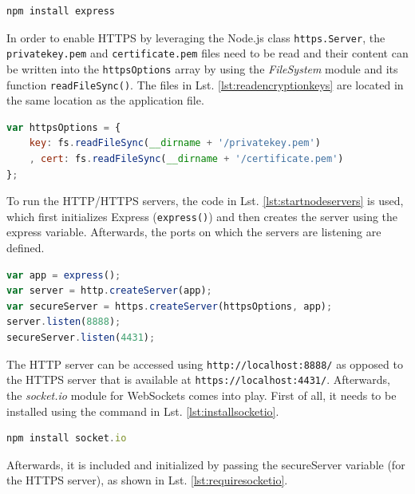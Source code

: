\begin{lstlisting}[language=javascript,caption={Installing Express via command-line},label=lst:expressinstallation]
npm install express 
\end{lstlisting}

In order to enable HTTPS by leveraging the Node.js class \texttt{https.Server}, the \texttt{privatekey.pem} and \texttt{certificate.pem} files need to be read and their content can be written into the \texttt{httpsOptions} array by using the \textit{FileSystem} module and its function \texttt{readFileSync()}. The files in Lst. \ref{lst:readencryptionkeys} are located in the same location as the application file.

\begin{lstlisting}[language=javascript,caption={Reading encryption keys},label=lst:readencryptionkeys]
var httpsOptions = {
    key: fs.readFileSync(__dirname + '/privatekey.pem')
    , cert: fs.readFileSync(__dirname + '/certificate.pem')
};
\end{lstlisting}

To run the HTTP/HTTPS servers, the code in Lst. \ref{lst:startnodeservers} is used, which first
initializes Express (\texttt{express()}) and then creates the server using the express variable.
Afterwards, the ports on which the servers are listening are defined.

\begin{lstlisting}[language=javascript,caption={Starting servers in Node.js},label=lst:startnodeservers]
var app = express();
var server = http.createServer(app);
var secureServer = https.createServer(httpsOptions, app);
server.listen(8888);
secureServer.listen(4431);
\end{lstlisting}

The HTTP server can be accessed using \texttt{http://localhost:8888/} as opposed to the
HTTPS server that is available at \texttt{https://localhost:4431/}. Afterwards, the
\textit{socket.io} module for WebSockets comes into play. First of all, it needs to be
installed using the command in Lst. \ref{lst:installsocketio}.

\begin{lstlisting}[language=javascript,caption={Command to install socket.io via Node.js' package manager},label=lst:installsocketio]
npm install socket.io
\end{lstlisting}

Afterwards, it is included and initialized by passing the secureServer variable
(for the HTTPS server), as shown in Lst. \ref{lst:requiresocketio}.

